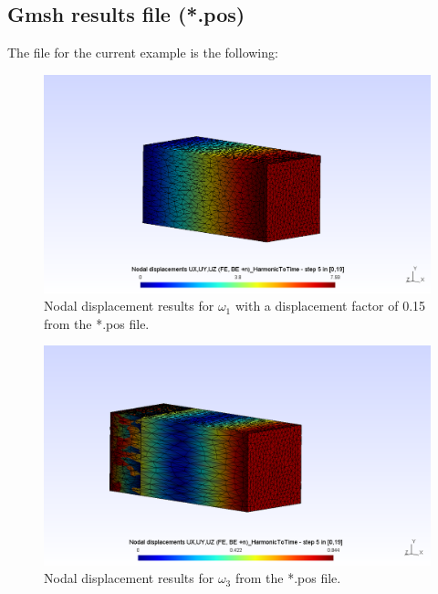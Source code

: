 \documentclass[a4]{article}
\begin{document}
\subsection{Gmsh results file (*.pos)}

The file for the current example is the following:

\begin{figure}[h]
	\centering
	\includegraphics[scale = 0.5]{u_w1.png}
	\caption{Nodal displacement results for $\omega_1$ with a displacement factor of 0.15 from the *.pos file.}
	\label{fig:u_w1}
\end{figure}

\begin{figure}[h!]
	\centering
	\includegraphics[scale = 0.5]{u_w3.png}
	\caption{Nodal displacement results for $\omega_3$ from the *.pos file.}
	\label{fig:u_w3}
\end{figure}
\end{document}
